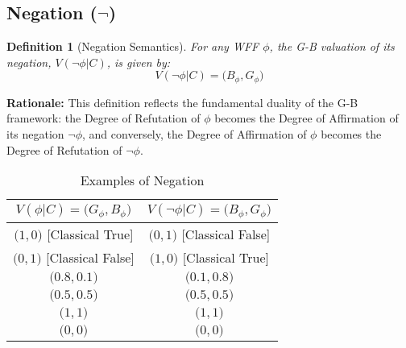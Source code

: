 \documentclass[11pt]{article}
\newcommand{\GB}[2]{\bigl(#1,#2\bigr)} %
\newtheorem{definition}{Definition}[section]
\theoremstyle{remark}
\begin{document}
\subsection{\texorpdfstring{Negation ($\neg$)}{Negation}}
\begin{definition}[Negation Semantics] \label{def:negation_sem}
For any WFF $\phi$, the G-B valuation of its negation, $V(\neg\phi|C)$, is given by:
$$V(\neg\phi|C) = \GB{B_\phi}{G_\phi}$$
\end{definition}
\textbf{Rationale:} This definition reflects the fundamental duality of the G-B framework: the Degree of Refutation of $\phi$ becomes the Degree of Affirmation of its negation $\neg\phi$, and conversely, the Degree of Affirmation of $\phi$ becomes the Degree of Refutation of $\neg\phi$.
\begin{table}[H] \centering \caption{Examples of Negation}\label{tab:negation_examples}
\begin{tabular}{@{}cc@{}} \toprule
\textbf{$V(\phi|C)=\GB{G_\phi}{B_\phi}$} & \textbf{$V(\neg\phi|C)=\GB{B_\phi}{G_\phi}$} \\ \midrule
$\GB{1}{0}$ [Classical True] & $\GB{0}{1}$ [Classical False] \\
$\GB{0}{1}$ [Classical False] & $\GB{1}{0}$ [Classical True] \\
$\GB{0.8}{0.1}$ & $\GB{0.1}{0.8}$ \\
$\GB{0.5}{0.5}$ & $\GB{0.5}{0.5}$ \\ 
$\GB{1}{1}$ & $\GB{1}{1}$ \\
$\GB{0}{0}$ & $\GB{0}{0}$ \\ \bottomrule
\end{tabular} \end{table}
\end{document}
